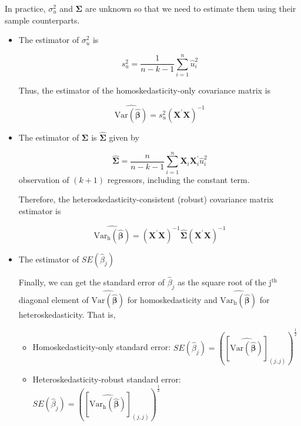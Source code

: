 \documentclass[a4paper,11pt]{article}
\newcommand{\var}{\mathrm{Var}}
\begin{document}
In practice, \(\sigma^2_u\) and \(\boldsymbol{\Sigma}\) are unknown so
that we need to estimate them using their sample counterparts.
\begin{itemize}
\item The estimator of \(\sigma^2_u\) is

\begin{equation}
\label{eq:sigma2u}
s^2_u = \frac{1}{n-k-1} \sum_{i=1}^n \hat{u}^2_i
\end{equation}

Thus, the estimator of the homoskedasticity-only covariance matrix
is

\begin{equation}
\label{eq:hat-vbhat-hm}
\widehat{\var(\hat{\boldsymbol{\beta}})} = s^2_u (\mathbf{X}^{\prime} \mathbf{X})^{-1}
\end{equation}

\item The estimator of \(\boldsymbol{\Sigma}\) is
\(\widehat{\boldsymbol{\Sigma}}\) given by

\begin{equation}
\label{eq:Sigmahat}
\widehat{\boldsymbol{\Sigma}} = \frac{n}{n-k-1} \sum_{i=1}^n
\mathbf{X}_i \mathbf{X}_i^{\prime} \hat{u}^2_i
\end{equation} 
observation of \((k+1)\) regressors, including the constant term.

Therefore, the heteroskedasticity-consistent (robust) covariance
matrix estimator is

\begin{equation}
\label{eq:hat-vbhat-ht}
\widehat{\var_{\mathrm{h}}(\hat{\boldsymbol{\beta}})} = \left(\mathbf{X}^{\prime} \mathbf{X}\right)^{-1} \widehat{\boldsymbol{\Sigma}} (\mathbf{X}^{\prime} \mathbf{X})^{-1}
\end{equation}

\item The estimator of \(SE(\hat{\beta}_j)\)

Finally, we can get the standard error of \(\hat{\beta}_j\) as the
square root of the j\(^{\text{th}}\) diagonal element of
\(\widehat{\var(\hat{\boldsymbol{\beta}})}\) for homoskedasticity and
\(\widehat{\var_{\mathrm{h}}(\hat{\boldsymbol{\beta}})}\) for
heteroskedasticity. That is,

\begin{itemize}
\item Homoskedasticity-only standard error: \(SE(\hat{\beta}_j) =
    \left(\left[\widehat{\var(\hat{\boldsymbol{\beta}})}\right]_{(j,j)}\right)^{\frac{1}{2}}\)

\item Heteroskedasticity-robust standard error: \(SE(\hat{\beta}_j) =
    \left(\left[\widehat{\var_{\mathrm{h}}(\hat{\boldsymbol{\beta}})}\right]_{(j,j)}\right)^{\frac{1}{2}}\)
\end{itemize}
\end{itemize}
\end{document}
